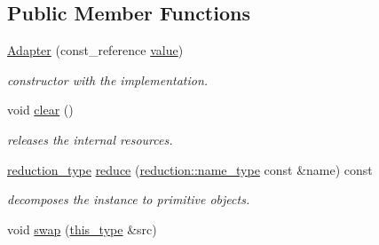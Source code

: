 \subsection*{Public Member Functions}
\begin{DoxyCompactItemize}
\item 
\hypertarget{classhryky_1_1http_1_1header_1_1cache_1_1directive_1_1_adapter_add9ee143d847a437e326b90f73f9736b}{\hyperlink{classhryky_1_1http_1_1header_1_1cache_1_1directive_1_1_adapter_add9ee143d847a437e326b90f73f9736b}{Adapter} (const\-\_\-reference \hyperlink{classhryky_1_1_adapter_ab736ecd30f215ca3cbd2364f818cb83f}{value})}\label{classhryky_1_1http_1_1header_1_1cache_1_1directive_1_1_adapter_add9ee143d847a437e326b90f73f9736b}

\begin{DoxyCompactList}\small\item\em constructor with the implementation. \end{DoxyCompactList}\item 
\hypertarget{classhryky_1_1_adapter_adbdbd187b837f6782b776ca8aabd411b}{void \hyperlink{classhryky_1_1_adapter_adbdbd187b837f6782b776ca8aabd411b}{clear} ()}\label{classhryky_1_1_adapter_adbdbd187b837f6782b776ca8aabd411b}

\begin{DoxyCompactList}\small\item\em releases the internal resources. \end{DoxyCompactList}\item 
\hypertarget{classhryky_1_1_adapter_a42532b43ac680d162bbc1a2e3ebc6b99}{\hyperlink{namespacehryky_a343a9a4c36a586be5c2693156200eadc}{reduction\-\_\-type} \hyperlink{classhryky_1_1_adapter_a42532b43ac680d162bbc1a2e3ebc6b99}{reduce} (\hyperlink{namespacehryky_1_1reduction_ac686c30a4c8d196bbd0f05629a6b921f}{reduction\-::name\-\_\-type} const \&name) const}\label{classhryky_1_1_adapter_a42532b43ac680d162bbc1a2e3ebc6b99}

\begin{DoxyCompactList}\small\item\em decomposes the instance to primitive objects. \end{DoxyCompactList}\item 
\hypertarget{classhryky_1_1_adapter_ae95517793bc16f6ba623bc994bc17c43}{void \hyperlink{classhryky_1_1_adapter_ae95517793bc16f6ba623bc994bc17c43}{swap} (\hyperlink{classhryky_1_1http_1_1header_1_1cache_1_1directive_1_1_adapter_ae4e3a627754a2a689982ce17e5fc5169}{this\-\_\-type} \&src)}\label{classhryky_1_1_adapter_ae95517793bc16f6ba623bc994bc17c43}


\end{DoxyCompactItemize}
